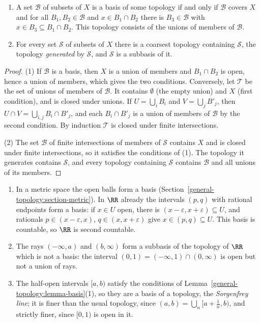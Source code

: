 \begin{lemma}\label{general-topology:lemma-basis}
\begin{enumerate}
\item A set $\mathcal{B}$ of subsets of $X$ is a basis of some topology if and only if $\mathcal{B}$ covers $X$ and for all
$B_1, B_2 \in \mathcal{B}$ and $x \in B_1 \cap B_2$ there is $B_3 \in \mathcal{B}$ with $x \in B_3 \subseteq B_1 \cap B_2$. This topology
consists of the unions of members of $\mathcal{B}$.
\item For every set $\mathcal{S}$ of subsets of $X$ there is a coarsest topology containing $\mathcal{S}$, the topology \emph{generated}
by $\mathcal{S}$, and $\mathcal{S}$ is a subbasis of it.
\end{enumerate}
\end{lemma}

\begin{proof}
(1) If $\mathcal{B}$ is a basis, then $X$ is a union of members and $B_1 \cap B_2$ is open, hence a union of members, which gives the two
conditions. Conversely, let $\mathcal{T}$ be the set of unions of members of $\mathcal{B}$. It contains $\emptyset$ (the empty union) and $X$
(first condition), and is closed under unions. If $U = \bigcup_i B_i$ and $V = \bigcup_j B'_j$, then $U \cap V = \bigcup_{i,j} B_i \cap B'_j$,
and each $B_i \cap B'_j$ is a union of members of $\mathcal{B}$ by the second condition. By induction $\mathcal{T}$ is closed under finite
intersections.

(2) The set $\mathcal{B}$ of finite intersections of members of $\mathcal{S}$ contains $X$ and is closed under finite intersections, so it
satisfies the conditions of (1). The topology it generates contains $\mathcal{S}$, and every topology containing $\mathcal{S}$ contains
$\mathcal{B}$ and all unions of its members.
\end{proof}

\begin{example}\label{general-topology:example-bases}
\begin{enumerate}
\item In a metric space the open balls form a basis (Section~\ref{general-topology:section-metric}). In $\RR$ already the intervals $(p, q)$ with rational endpoints form a basis: if $x \in U$ open, there is
$(x - \varepsilon, x + \varepsilon) \subseteq U$, and rationals $p \in (x - \varepsilon, x)$, $q \in (x, x + \varepsilon)$ give $x \in (p, q) \subseteq U$. This basis is countable, so $\RR$ is second countable.
\item The rays $(-\infty, a)$ and $(b, \infty)$ form a subbasis of the topology of $\RR$ which is not a basis: the interval $(0, 1) = (-\infty, 1) \cap (0, \infty)$ is open but not a union of rays.
\item The half-open intervals $[a, b)$ satisfy the conditions of Lemma~\ref{general-topology:lemma-basis}(1), so they are a basis of a topology, the \emph{Sorgenfrey line}; it is finer than the usual topology,
since $(a, b) = \bigcup_n[a + \frac1n, b)$, and strictly finer, since $[0, 1)$ is open in it.
\end{enumerate}
\end{example}

